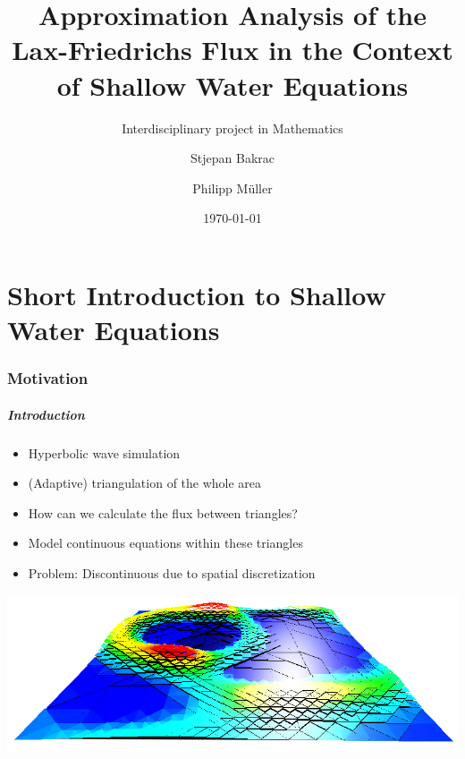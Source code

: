 \documentclass{beamer}
\title[]{Approximation Analysis of the Lax-Friedrichs Flux in the Context of Shallow Water Equations}
\subtitle{Interdisciplinary project in Mathematics}
\author[S. Bakrac, P. Müller]{Stjepan Bakrac \and Philipp Müller}
\date{\today}
\institute[TU München]{Technische Universität München}
\newcommand{\todo}[1]{
  \textcolor{red}{TODO: #1}
  \note{\textcolor{red}{TODO: #1}}
}
\renewcommand{\todo}[1]{}
\begin{document}
\todo{Nicht vergessen, wieder reinzukommentieren!}
\frame{\titlepage}

\part{Short Introduction to Shallow Water Equations}
\label{part:introduction}

\section{Motivation}

\begin{frame}
  \frametitle{Introduction}
  \begin{itemize}
  \item Hyperbolic wave simulation
  \item (Adaptive) triangulation of the whole area
  \item How can we calculate the flux between triangles?
  \item Model continuous equations within these triangles
  \item Problem: Discontinuous due to spatial discretization
  \end{itemize}
  \begin{center}
    \includegraphics[scale=1.5]{sample-screenshot2.png}
  \end{center}
\end{frame}

\end{document}
